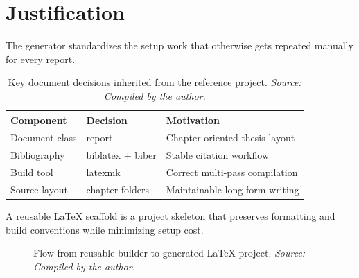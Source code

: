 \section{Justification}
\label{sec:justification}

The generator standardizes the setup work that otherwise gets repeated manually for every report.

\begin{table}[H]
  \centering
  \begin{tabular}{@{}lll@{}}
    \toprule
    Component & Decision & Motivation \\
    \midrule
    Document class & report & Chapter-oriented thesis layout \\
    Bibliography & biblatex + biber & Stable citation workflow \\
    Build tool & latexmk & Correct multi-pass compilation \\
    Source layout & chapter folders & Maintainable long-form writing \\
    \bottomrule
  \end{tabular}
  \caption{Key document decisions inherited from the reference project. \textit{Source: Compiled by the author.}}
  \label{tab:template-decisions}
\end{table}

\begin{definition}
  A reusable LaTeX scaffold is a project skeleton that preserves formatting and build conventions while minimizing setup cost.
\end{definition}

\begin{figure}[H]
  \centering
  \caption{Flow from reusable builder to generated LaTeX project. \textit{Source: Compiled by the author.}}
  \label{fig:scaffold-flow}
\end{figure}
